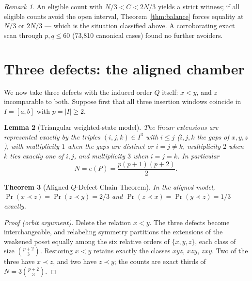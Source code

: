 \documentclass[11pt]{article}
\newtheorem{theorem}{Theorem}[section]
\newtheorem{lemma}[theorem]{Lemma}
\theoremstyle{definition}
\theoremstyle{remark}
\newtheorem{remark}[theorem]{Remark}
\newcommand{\pr}{\operatorname{Pr}}
\begin{document}
\begin{remark}
An eligible count with $N/3<C<2N/3$ yields a strict witness; if all eligible counts avoid
the open interval, Theorem~\ref{thm:balance} forces equality at $N/3$ or $2N/3$ --- which
is the situation classified above. A corroborating exact scan through $p,q\le60$ (73{,}810
canonical cases) found no further avoiders. %
\end{remark}

\section{Three defects: the aligned chamber}
We now take three defects with the induced order $Q$ itself: $x<y$, and $z$ incomparable
to both. Suppose first that all three insertion windows coincide in $I=[a,b]$ with
$p=|I|\ge2$.

\begin{lemma}[Triangular weighted-state model]\label{lem:tristate}
The linear extensions are represented exactly by the triples $(i,j,k)\in I^3$ with
$i\le j$ ($i,j,k$ the gaps of $x,y,z$), with multiplicity $1$ when the gaps are distinct
or $i=j\ne k$, multiplicity $2$ when $k$ ties exactly one of $i,j$, and multiplicity $3$
when $i=j=k$. In particular
\[
N=e(P)=\frac{p(p+1)(p+2)}{2}.
\]
\end{lemma}

\begin{theorem}[Aligned $Q$-Defect Chain Theorem]\label{thm:aligned}
In the aligned model, $\pr(x\prec z)=\pr(z\prec y)=2/3$ and
$\pr(z\prec x)=\pr(y\prec z)=1/3$ exactly.
\end{theorem}

\begin{proof}[Proof (orbit argument)]
Delete the relation $x<y$. The three defects become interchangeable, and relabeling
symmetry partitions the extensions of the weakened poset equally among the six relative
orders of $\{x,y,z\}$, each class of size $\binom{p+2}{3}$. Restoring $x<y$ retains
exactly the classes $xyz$, $xzy$, $zxy$. Two of the three have $x\prec z$, and two have
$z\prec y$; the counts are exact thirds of $N=3\binom{p+2}{3}$.
\end{proof}
\end{document}
